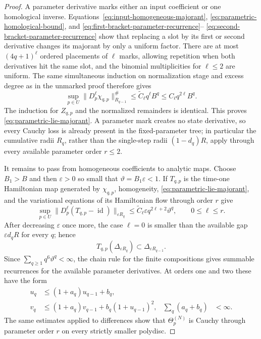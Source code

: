 \documentclass[11pt]{amsart}
\numberwithin{equation}{section}
\theoremstyle{definition}
\theoremstyle{remark}
\begin{document}
\begin{proof}
A parameter derivative marks either an input coefficient or one
homological inverse.  Equations~\eqref{eq:input-homogeneous-majorant},
\eqref{eq:parametric-homological-bound}, and
\eqref{eq:first-bracket-parameter-recurrence}--
\eqref{eq:second-bracket-parameter-recurrence} show that replacing a slot
by its first or second derivative changes its majorant by only a uniform
factor.  There are at most $(4q+1)^\ell$ ordered placements of $\ell$
marks, allowing repetition when both derivatives hit the same slot, and
the binomial multiplicities for $\ell\le2$ are uniform.  The
same simultaneous induction on normalization stage and excess degree as
in the unmarked proof therefore gives
\[
 \sup_{p\in U}\|D_p^\ell\chi_{q,p}\|_{R_{q-1}}^\#
 \le \widetilde C_\ell q^\ell B^q
 \le C_\ell q^{2\ell}B^q.
\]
The induction for $Z_{q,p}$ and the normalized remainders is identical.
This proves \eqref{eq:parametric-lie-majorant}.  A parameter mark creates
no state derivative, so every Cauchy loss is already present in the
fixed-parameter tree; in particular the cumulative radii $R_q$, rather
than the single-step radii $(1-d_q)R$, apply through every available
parameter order $r\le2$.

It remains to pass from homogeneous coefficients to analytic maps.  Choose
$B_1>B$ and then $\varepsilon>0$ so small that
$\vartheta=B_1\varepsilon<1$.  If $T_{q,p}$ is the time-one Hamiltonian
map generated by $\chi_{q,p}$, homogeneity,
\eqref{eq:parametric-lie-majorant}, and the variational equations of its
Hamiltonian flow through order $r$ give
\begin{equation}\label{eq:parametric-normalizing-map-increments}
 \sup_{p\in U}
 \|D_p^\ell(T_{q,p}-\operatorname{id})\|_{\varepsilon R_q}
 \le \widetilde C_\ell\varepsilon
      q^{2\ell+2}\vartheta^q,
 \qquad 0\le\ell\le r.
\end{equation}
After decreasing $\varepsilon$ once more, the case $\ell=0$ is smaller
than the available gap $\varepsilon d_qR$ for every $q$; hence
\[
 T_{q,p}(\Delta_{\varepsilon R_q})
 \subset\Delta_{\varepsilon R_{q-1}}.
\]
Since $\sum_{q\ge1}q^6\vartheta^q<\infty$, the chain rule for the finite
compositions gives summable recurrences for the available parameter
derivatives.  At orders one and two these have the form
\[
 \begin{aligned}
 u_q&\le(1+a_q)u_{q-1}+b_q,\\
 v_q&\le(1+a_q)v_{q-1}+b_q(1+u_{q-1})^2,
 &\sum_q(a_q+b_q)&<\infty.
 \end{aligned}
\]
The same estimates applied to differences show that $\Theta_p^{(N)}$ is
Cauchy through parameter order $r$ on every strictly smaller polydisc.


\end{proof}
\end{document}
